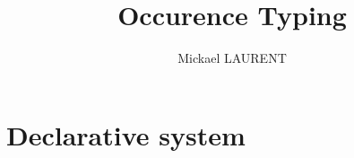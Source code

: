 \documentclass[a4paper]{article}%
\title{\vspace{1.5cm}Occurence Typing}
\author{Mickael LAURENT}
\date{\vspace{-5ex}}
\begin{document}
    \maketitle





    \section{Declarative system}
\end{document}

